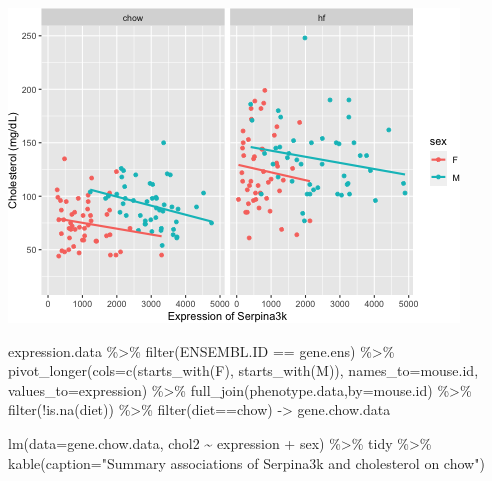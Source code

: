 \documentclass[
]{article}
\newenvironment{Shaded}{\begin{snugshade}}{\end{snugshade}}
\newcommand{\AttributeTok}[1]{\textcolor[rgb]{0.77,0.63,0.00}{#1}}
\newcommand{\FunctionTok}[1]{\textcolor[rgb]{0.00,0.00,0.00}{#1}}
\newcommand{\NormalTok}[1]{#1}
\newcommand{\OtherTok}[1]{\textcolor[rgb]{0.56,0.35,0.01}{#1}}
\newcommand{\SpecialCharTok}[1]{\textcolor[rgb]{0.00,0.00,0.00}{#1}}
\newcommand{\StringTok}[1]{\textcolor[rgb]{0.31,0.60,0.02}{#1}}
\begin{document}
\includegraphics{figures/serpina3k-associations-1.png}

\begin{Shaded}
\begin{Highlighting}[]
\NormalTok{expression.data }\SpecialCharTok{\%\textgreater{}\%}
  \FunctionTok{filter}\NormalTok{(ENSEMBL.ID }\SpecialCharTok{==}\NormalTok{ gene.ens) }\SpecialCharTok{\%\textgreater{}\%}
  \FunctionTok{pivot\_longer}\NormalTok{(}\AttributeTok{cols=}\FunctionTok{c}\NormalTok{(}\FunctionTok{starts\_with}\NormalTok{(}\StringTok{\textquotesingle{}F\textquotesingle{}}\NormalTok{),}
                      \FunctionTok{starts\_with}\NormalTok{(}\StringTok{\textquotesingle{}M\textquotesingle{}}\NormalTok{)),}
               \AttributeTok{names\_to=}\StringTok{\textquotesingle{}mouse.id\textquotesingle{}}\NormalTok{,}
               \AttributeTok{values\_to=}\StringTok{\textquotesingle{}expression\textquotesingle{}}\NormalTok{) }\SpecialCharTok{\%\textgreater{}\%}
  \FunctionTok{full\_join}\NormalTok{(phenotype.data,}\AttributeTok{by=}\StringTok{\textquotesingle{}mouse.id\textquotesingle{}}\NormalTok{) }\SpecialCharTok{\%\textgreater{}\%}
  \FunctionTok{filter}\NormalTok{(}\SpecialCharTok{!}\FunctionTok{is.na}\NormalTok{(diet)) }\SpecialCharTok{\%\textgreater{}\%}
  \FunctionTok{filter}\NormalTok{(diet}\SpecialCharTok{==}\StringTok{\textquotesingle{}chow\textquotesingle{}}\NormalTok{) }\OtherTok{{-}\textgreater{}}\NormalTok{ gene.chow.data}

\FunctionTok{lm}\NormalTok{(}\AttributeTok{data=}\NormalTok{gene.chow.data, chol2 }\SpecialCharTok{\textasciitilde{}}\NormalTok{ expression }\SpecialCharTok{+}\NormalTok{ sex) }\SpecialCharTok{\%\textgreater{}\%}
\NormalTok{  tidy }\SpecialCharTok{\%\textgreater{}\%}
  \FunctionTok{kable}\NormalTok{(}\AttributeTok{caption=}\StringTok{"Summary associations of Serpina3k and cholesterol on chow"}\NormalTok{)}
\end{Highlighting}
\end{Shaded}
\end{document}
